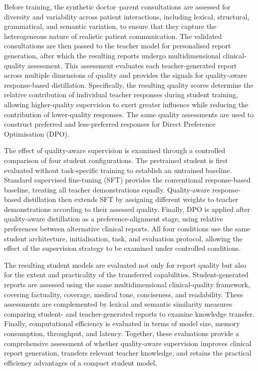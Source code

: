 \documentclass[ %
                    author={Aman Kumar Singh},
                supervisor={Dr. Edwin Simpson},
                    degree={MSc},
                     title={Quality-Aware Knowledge Distillation of Large Language Models for Efficient Personalised Clinical Report Generation},
                  subtitle={},
                      type={},
                      year={2021}]{dissertation}
\begin{document}
Before training, the synthetic doctor--parent consultations are assessed for
diversity and variability across patient interactions, including lexical,
structural, grammatical, and semantic variation, to ensure that they capture
the heterogeneous nature of realistic patient communication. The validated
consultations are then passed to the teacher model for personalised report
generation, after which the resulting reports undergo multidimensional
clinical-quality assessment. This assessment evaluates each teacher-generated
report across multiple dimensions of quality and provides the signals for
quality-aware response-based distillation. Specifically, the resulting
quality scores determine the relative contribution of individual teacher
responses during student training, allowing higher-quality supervision to
exert greater influence while reducing the contribution of lower-quality
responses. The same quality assessments are used to construct preferred and
less-preferred responses for Direct Preference Optimisation (DPO).

The effect of quality-aware supervision is examined through a controlled
comparison of four student configurations. The pretrained student is first
evaluated without task-specific training to establish an untrained baseline.
Standard supervised fine-tuning (SFT) provides the conventional
response-based baseline, treating all teacher demonstrations equally.
Quality-aware response-based distillation then extends SFT by assigning
different weights to teacher demonstrations according to their assessed
quality. Finally, DPO is applied after quality-aware distillation as a
preference-alignment stage, using relative preferences between alternative
clinical reports. All four conditions use the same student architecture,
initialisation, task, and evaluation protocol, allowing the effect of the
supervision strategy to be examined under controlled conditions.

The resulting student models are evaluated not only for report quality but
also for the extent and practicality of the transferred capabilities.
Student-generated reports are assessed using the same multidimensional
clinical-quality framework, covering factuality, coverage, medical tone,
conciseness, and readability. These assessments are complemented by lexical
and semantic similarity measures comparing student- and teacher-generated
reports to examine knowledge transfer. Finally, computational efficiency is
evaluated in terms of model size, memory consumption, throughput, and
latency. Together, these evaluations provide a comprehensive assessment of
whether quality-aware supervision improves clinical report generation,
transfers relevant teacher knowledge, and retains the practical efficiency
advantages of a compact student model.
\end{document}
